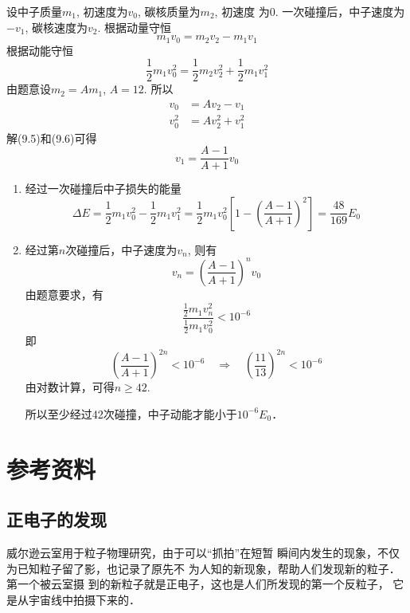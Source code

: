 \begin{enumerate}
\begin{solution}
    设中子质量$m_1$, 初速度为$v_0$, 碳核质量为$m_2$, 初速度
    为0. 一次碰撞后，中子速度为$-v_1$, 碳核速度为$v_2$. 
    根据动量守恒
\begin{equation}
    m_1v_0=m_2v_2-m_1v_1
\end{equation}
根据动能守恒
\begin{equation}
    \frac{1}{2}m_1v_0^2=\frac{1}{2}m_2v_2^2+\frac{1}{2}m_1v_1^2
\end{equation}
由题意设$m_2=Am_1$, $A=12$. 
所以
\begin{align}
    v_0&=Av_2-v_1\\
    v^2_0&=Av^2_2+v_1^2
\end{align}
解(9.5)和(9.6)可得
\begin{equation}
v_1=\frac{A-1}{A+1}v_0
\end{equation}
\begin{enumerate}
\item 经过一次碰撞后中子损失的能量
\[\Delta E=\frac{1}{2}m_1v_0^2-\frac{1}{2}m_1v_1^2=\frac{1}{2}m_1v^2_0\left[1-\left(\frac{A-1}{A+1}\right)^2\right]=\frac{48}{169}E_0\]

\item 经过第$n$次碰撞后，中子速度为$v_n$, 则有
\[v_n=\left(\frac{A-1}{A+1}\right)^n v_0\]
由题意要求，有
\[ \frac{\frac{1}{2}m_1v_n^2}{\frac{1}{2}m_1v_0^2}<10^{-6} \]
即
\[\left(\frac{A-1}{A+1}\right)^{2n}<10^{-6}\quad \Rightarrow\quad \left(\frac{11}{13}\right)^{2n}<10^{-6}\]
由对数计算，可得$n\ge 42$. 

所以至少经过42次碰撞，中子动能才能小于$10^{-6}E_0$．
\end{enumerate}
\end{solution}
\end{enumerate}


\section{参考资料}
\subsection{正电子的发现}
威尔逊云室用于粒子物理研究，由于可以“抓拍”在短暂
瞬间内发生的现象，不仅为已知粒子留了影，也记录了原先不
为人知的新现象，帮助人们发现新的粒子．第一个被云室摄
到的新粒子就是正电子，这也是人们所发现的第一个反粒子，
它是从宇宙线中拍摄下来的．

